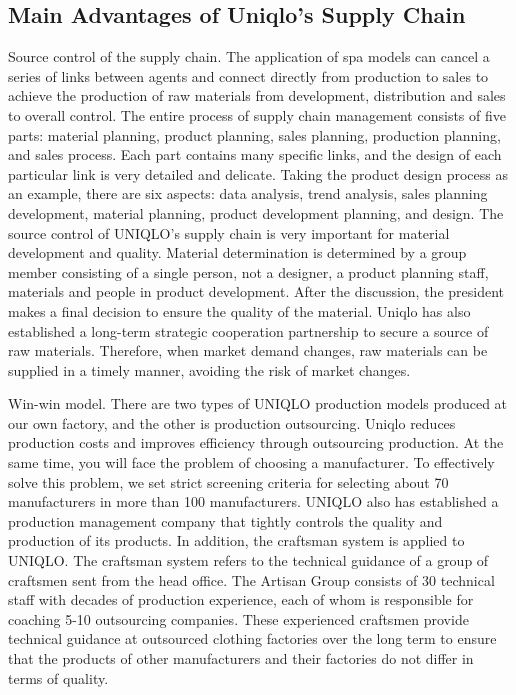 \documentclass[]{article}
\begin{document}
\hypertarget{main-advantages-of-uniqlos-supply-chain}{%
\subsection{Main Advantages of Uniqlo's Supply
Chain}\label{main-advantages-of-uniqlos-supply-chain}}

Source control of the supply chain. The application of spa models can
cancel a series of links between agents and connect directly from
production to sales to achieve the production of raw materials from
development, distribution and sales to overall control. The entire
process of supply chain management consists of five parts: material
planning, product planning, sales planning, production planning, and
sales process. Each part contains many specific links, and the design of
each particular link is very detailed and delicate. Taking the product
design process as an example, there are six aspects: data analysis,
trend analysis, sales planning development, material planning, product
development planning, and design. The source control of UNIQLO's supply
chain is very important for material development and quality. Material
determination is determined by a group member consisting of a single
person, not a designer, a product planning staff, materials and people
in product development. After the discussion, the president makes a
final decision to ensure the quality of the material. Uniqlo has also
established a long-term strategic cooperation partnership to secure a
source of raw materials. Therefore, when market demand changes, raw
materials can be supplied in a timely manner, avoiding the risk of
market changes.

Win-win model. There are two types of UNIQLO production models produced
at our own factory, and the other is production outsourcing. Uniqlo
reduces production costs and improves efficiency through outsourcing
production. At the same time, you will face the problem of choosing a
manufacturer. To effectively solve this problem, we set strict screening
criteria for selecting about 70 manufacturers in more than 100
manufacturers. UNIQLO also has established a production management
company that tightly controls the quality and production of its
products. In addition, the craftsman system is applied to UNIQLO. The
craftsman system refers to the technical guidance of a group of
craftsmen sent from the head office. The Artisan Group consists of 30
technical staff with decades of production experience, each of whom is
responsible for coaching 5-10 outsourcing companies. These experienced
craftsmen provide technical guidance at outsourced clothing factories
over the long term to ensure that the products of other manufacturers
and their factories do not differ in terms of quality.
\end{document}
